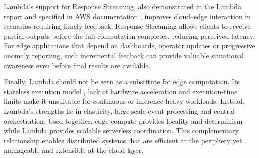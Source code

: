 Lambda’s support for Response Streaming, also demonstrated in the Lambda report \cite{lambda_report} and specified in AWS documentation \cite{aws_response_streaming}, improves cloud–edge interaction in scenarios requiring timely feedback. Response Streaming allows clients to receive partial outputs before the full computation completes, reducing perceived latency. For edge applications that depend on dashboards, operator updates or progressive anomaly reporting, such incremental feedback can provide valuable situational awareness even before final results are available.

Finally, Lambda should not be seen as a substitute for edge computation. Its stateless execution model \cite{aws_lambda_runtime, aws_serverless_whitepaper}, lack of hardware acceleration \cite{wang_peeking_serverless} and execution-time limits make it unsuitable for continuous or inference-heavy workloads. Instead, Lambda’s strengths lie in elasticity, large-scale event processing and central orchestration. Used together, edge compute provides locality and determinism while Lambda provides scalable serverless coordination. This complementary relationship enables distributed systems that are efficient at the periphery yet manageable and extensible at the cloud layer. \cite{openai_llm_drafting}
